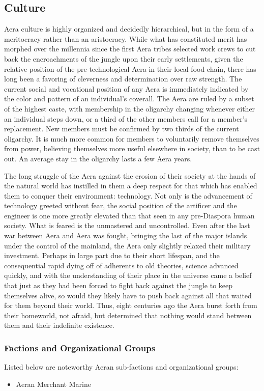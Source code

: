 \subsection{Culture}
Aera culture is highly organized and decidedly hierarchical, but in
the form of a meritocracy rather than an aristocracy. While what has
constituted merit has morphed over the millennia since the first Aera
tribes selected work crews to cut back the encroachments of the jungle
upon their early settlements, given the relative position of the
pre-technological Aera in their local food chain, there has long been
a favoring of cleverness and determination over raw strength. The
current social and vocational position of any Aera is immediately
indicated by the color and pattern of an individual's coverall. The
Aera are ruled by a subset of the highest caste, with membership in
the oligarchy changing whenever either an individual steps down, or a
third of the other members call for a member's replacement. New
members must be confirmed by two thirds of the current oligarchy. It
is much more common for members to voluntarily remove themselves from
power, believing themselves more useful elsewhere in society, than to
be cast out. An average stay in the oligarchy lasts a few Aera years.

The long struggle of the Aera against the erosion of their society at
the hands of the natural world has instilled in them a deep respect
for that which has enabled them to conquer their environment:
technology. Not only is the advancement of technology greeted without
fear, the social position of the artificer and the engineer is one
more greatly elevated than that seen in any pre-Diaspora human
society. What is feared is the unmastered and uncontrolled. Even after
the last war between Aera and Aera was fought, bringing the last of
the major islands under the control of the mainland, the Aera only
slightly relaxed their military investment. Perhaps in large part due
to their short lifespan, and the consequential rapid dying off of
adherents to old theories, science advanced quickly, and with the
understanding of their place in the universe came a belief that just
as they had been forced to fight back against the jungle to keep
themselves alive, so would they likely have to push back against all
that waited for them beyond their world. Thus, eight centuries ago the
Aera burst forth from their homeworld, not afraid, but determined that
nothing would stand between them and their indefinite existence.

\subsubsection{Factions and Organizational Groups}
Listed below are noteworthy Aeran sub-factions and organizational groups: 
\begin{itemize}
\item Aeran Merchant Marine
\end{itemize}

